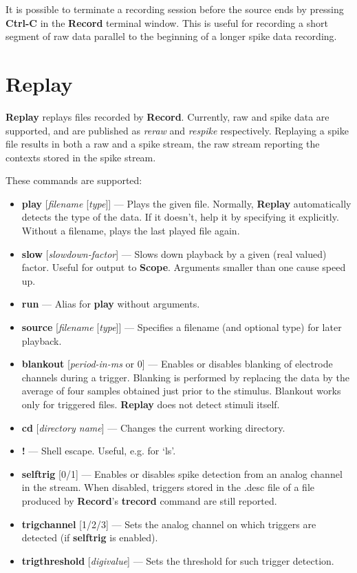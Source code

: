 \documentclass[12pt,oneside]{book}
\def\prog#1{{\bf #1}}
\def\cmd#1{{\bf #1}}
\def\arg#1{{\it #1}}
\def\stream#1{{\it #1}\xspace}
\def\streamtype#1{{\sc #1}\xspace}
\def\raw{\streamtype{raw}}
\def\spike{\streamtype{spike}}
\def\intr{{\bf Ctrl-C}\xspace}
\def\filename#1{{\sf #1}\xspace}
\begin{document}
It is possible to terminate a recording session before the source ends
by pressing \intr in the \prog{Record} terminal window. This is
useful for recording a short segment of \raw data parallel to the
beginning of a longer \spike data recording.

\section{Replay}

\prog{Replay} replays files recorded by \prog{Record}. Currently,
\raw and \spike data are supported, and are published as
\stream{reraw} and \stream{respike} respectively. Replaying a \spike
file results in both a \raw and a \spike stream, the \raw stream
reporting the contexts stored in the \spike stream.

These commands are supported:

\begin{itemize}
\item \cmd{play} [\arg{filename} [\arg{type}]] --- Plays the given file. Normally,
\prog{Replay} automatically detects the type of the data. If it
doesn't, help it by specifying it explicitly. Without a filename,
plays the last played file again.
\item \cmd{slow} [\arg{slowdown-factor}] --- Slows down playback by a given
(real valued) factor. Useful for output to \prog{Scope}. Arguments
smaller than one cause speed up.
\item \cmd{run} --- Alias for \cmd{play} without arguments.
\item \cmd{source} [\arg{filename} [\arg{type}]] --- Specifies a filename (and
optional type) for later playback.
\item \cmd{blankout} [\arg{period-in-ms} or 0] --- Enables or disables
blanking of electrode channels during a trigger. Blanking is performed by
replacing the data by the average of four samples obtained just prior
to the stimulus. Blankout works only for triggered files.
\prog{Replay} does not detect stimuli itself.
\item \cmd{cd} [\arg{directory name}] --- Changes the current working directory.
\item \cmd{!} --- Shell escape. Useful, e.g. for `ls'.
\item \cmd{selftrig} [0/1] --- Enables or disables spike detection
from an analog channel in the stream. When disabled, triggers stored
in the \filename{.desc} file of a file produced by \prog{Record}'s
\cmd{trecord} command are still reported.
\item \cmd{trigchannel} [1/2/3] --- Sets the analog channel on which
triggers are detected (if \cmd{selftrig} is enabled).
\item \cmd{trigthreshold} [\arg{digivalue}] --- Sets the threshold for such
trigger detection.
\end{itemize}
\end{document}
